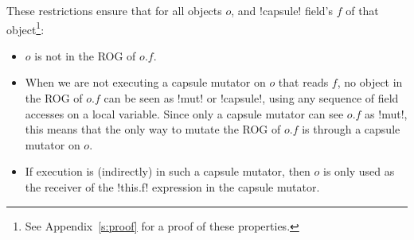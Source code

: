 \noindent These restrictions ensure that for all objects $o$, and \Q!capsule! field's $f$ of that object\footnote{See Appendix~\ref{s:proof} for a proof of these properties.}:
\SSI\begin{itemize}
	\item $o$ is not in the ROG of $o.f$.
\item 
When we are not executing a capsule mutator on $o$ that reads $f$, no object in the ROG of $o.f$ can be seen as \Q!mut! or \Q!capsule!, using any sequence of field accesses on a local variable.
Since only a capsule mutator can see $o.f$ as \Q!mut!, this means that the only way to mutate the ROG of $o.f$ is through a capsule mutator on $o$.
%
	\item If execution is (indirectly) in such a capsule mutator, then $o$ is only used as the receiver of the \Q!this.f! expression in the capsule mutator. %

\end{itemize} 
